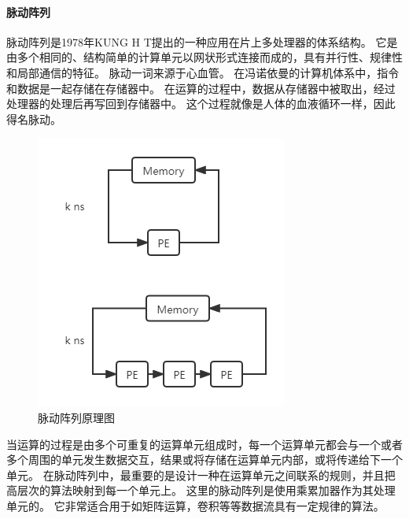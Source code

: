 \paragraph{脉动阵列}
脉动阵列是1978年KUNG H T提出的一种应用在片上多处理器的体系结构。
它是由多个相同的、结构简单的计算单元以网状形式连接而成的，具有并行性、规律性和局部通信的特征。
脉动一词来源于心血管。
在冯诺依曼的计算机体系中，指令和数据是一起存储在存储器中。
在运算的过程中，数据从存储器中被取出，经过处理器的处理后再写回到存储器中。
这个过程就像是人体的血液循环一样，因此得名脉动。  
\begin{figure}[htbp]
    \centering
    \includegraphics[]{figures/systolic_array.png}
    \caption{脉动阵列原理图}
    \label{systolic}
\end{figure}   

当运算的过程是由多个可重复的运算单元组成时，每一个运算单元都会与一个或者多个周围的单元发生数据交互，结果或将存储在运算单元内部，或将传递给下一个单元。
在脉动阵列中，最重要的是设计一种在运算单元之间联系的规则，并且把高层次的算法映射到每一个单元上。
这里的脉动阵列是使用乘累加器作为其处理单元的。
它非常适合用于如矩阵运算，卷积等等数据流具有一定规律的算法。  


